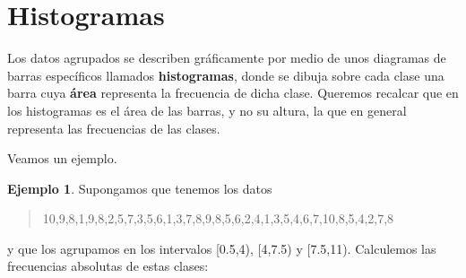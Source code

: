 \documentclass[
]{book}
\theoremstyle{definition}
\theoremstyle{definition}
\newtheorem{example}{Ejemplo}[chapter]
\theoremstyle{definition}
\theoremstyle{remark}
\begin{document}
\hypertarget{sec:hist}{%
\section{Histogramas}\label{sec:hist}}

Los datos agrupados se describen gráficamente por medio de unos diagramas de barras específicos llamados \textbf{histogramas}, donde se dibuja sobre cada clase una barra cuya \textbf{área} representa la frecuencia de dicha clase. Queremos recalcar que en los histogramas es el área de las barras, y no su altura, la que en general representa las frecuencias de las clases.

Veamos un ejemplo.

\begin{example}
\protect\hypertarget{exm:1115}{}{\label{exm:1115} }Supongamos que tenemos los datos
\end{example}

\begin{quote}
10,9,8,1,9,8,2,5,7,3,5,6,1,3,7,8,9,8,5,6,2,4,1,3,5,4,6,7,10,8,5,4,2,7,8
\end{quote}

y que los agrupamos en los intervalos {[}0.5,4), {[}4,7.5) y {[}7.5,11).
Calculemos las frecuencias absolutas de estas clases:
\end{document}
